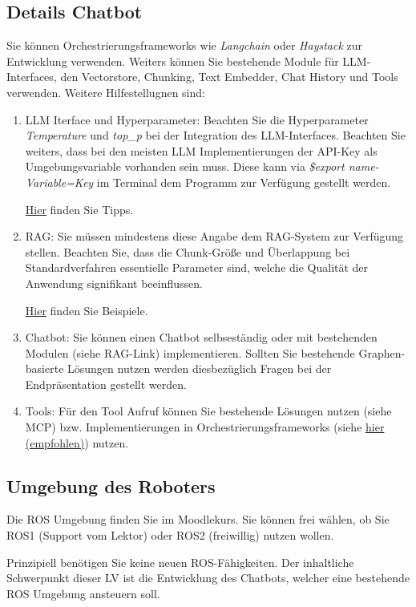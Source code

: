 \documentclass{article}
\begin{document}
\subsection{Details Chatbot}
Sie können Orchestrierungsframeworks wie \textit{Langchain} oder \textit{Haystack} zur Entwicklung verwenden. 
Weiters können Sie bestehende Module für LLM-Interfaces, den Vectorstore, Chunking, Text Embedder, Chat History und Tools verwenden. 
Weitere Hilfestellugnen sind:
\begin{enumerate}
    \item LLM Iterface und Hyperparameter: Beachten Sie die Hyperparameter \textit{Temperature} und \textit{top\_p} bei der Integration des LLM-Interfaces. Beachten Sie weiters, dass bei den meisten LLM Implementierungen der API-Key als Umgebungsvariable vorhanden sein muss. 
    Diese kann via \textit{\$export name-Variable=Key} im Terminal dem Programm zur Verfügung gestellt werden.

    \href{https://python.langchain.com/docs/integrations/chat/google_generative_ai/}{Hier} finden Sie Tipps.
    \item RAG: Sie müssen mindestens diese Angabe dem RAG-System zur Verfügung stellen. Beachten Sie, dass die Chunk-Größe und Überlappung bei Standardverfahren essentielle Parameter sind, welche die Qualität der Anwendung signifikant beeinflussen.

    \href{https://python.langchain.com/docs/tutorials/rag/}{Hier} finden Sie Beispiele.
    \item Chatbot: Sie können einen Chatbot selbseständig oder mit bestehenden Modulen (siehe RAG-Link) implementieren. Sollten Sie bestehende Graphen-basierte Lösungen nutzen werden diesbezüglich Fragen bei der Endpräsentation gestellt werden.
    \item Tools: Für den Tool Aufruf können Sie bestehende Lösungen nutzen (siehe MCP) bzw. Implementierungen in Orchestrierungsframeworks (siehe \href{https://python.langchain.com/docs/concepts/tool_calling/}{hier (empfohlen)}) nutzen.
\end{enumerate}
\subsection{Umgebung des Roboters}
Die ROS Umgebung finden Sie im Moodlekurs. Sie können frei wählen, ob Sie ROS1 (Support vom Lektor) oder ROS2 (freiwillig) nutzen wollen. 

Prinzipiell benötigen Sie keine neuen ROS-Fähigkeiten. Der inhaltliche Schwerpunkt dieser LV ist die Entwicklung des Chatbots, welcher eine bestehende ROS Umgebung ansteuern soll.
\end{document}
